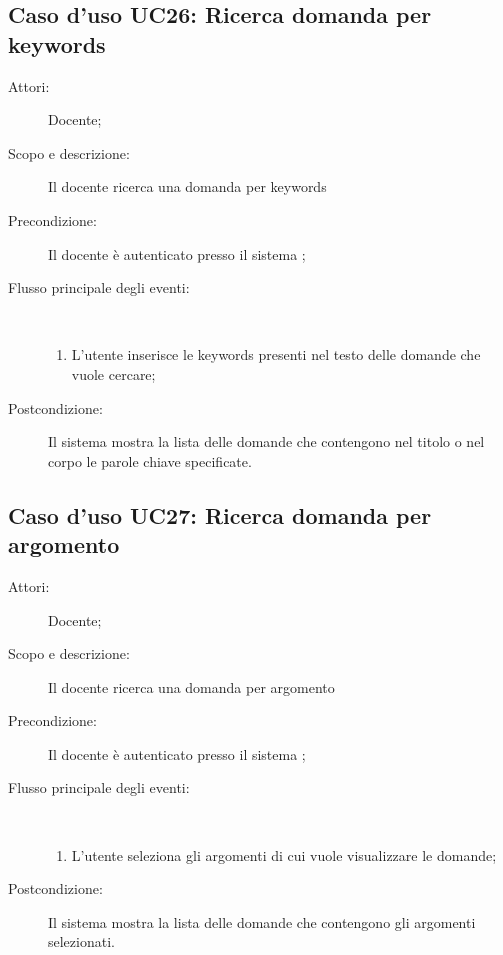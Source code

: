 \subsection{Caso d'uso UC26: Ricerca domanda per keywords}\begin{description}
	\item[Attori:] Docente;
	\item[Scopo e descrizione:] Il docente  ricerca una domanda per keywords
	
	\item[Precondizione:] Il docente è autenticato presso il sistema
	;
	
	\item[Flusso principale degli eventi:] \ 
	\begin{enumerate}
		\item L'utente inserisce le keywords presenti nel testo delle domande che vuole cercare;
		
	\end{enumerate}
	\item[Postcondizione:] Il sistema mostra la lista delle domande che contengono nel titolo o nel corpo le parole chiave specificate.
\end{description}
\hypertarget{UC27}{}
\subsection{Caso d'uso UC27: Ricerca domanda per argomento}\begin{description}
	\item[Attori:] Docente;
	\item[Scopo e descrizione:] Il docente ricerca una domanda per argomento
	\item[Precondizione:] Il docente è autenticato presso il sistema
	;
	
	\item[Flusso principale degli eventi:] \ 
	\begin{enumerate}
		\item L'utente seleziona gli argomenti di cui vuole visualizzare le domande;
		
	\end{enumerate}
	\item[Postcondizione:] Il sistema mostra la lista delle domande che contengono gli argomenti selezionati.
\end{description}
\hypertarget{UC28}{}
